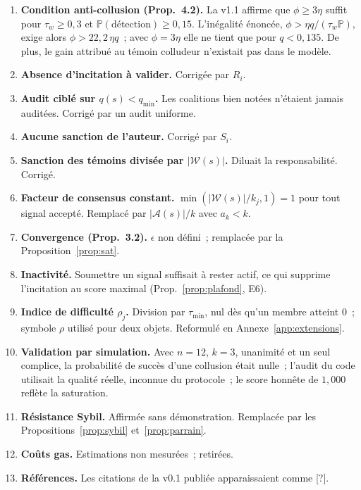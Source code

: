 \documentclass[11pt,a4paper]{article}
\theoremstyle{plain}
\theoremstyle{definition}
\theoremstyle{remark}
\newcommand{\1}{\mathbf{1}}
\newcommand{\Prob}{\mathbb{P}}
\begin{document}
\begin{enumerate}
  \item \textbf{Condition anti-collusion (Prop.~4.2).} La v1.1 affirme que
    $\phi\ge3\eta$ suffit pour $\tau_w\ge0{,}3$ et $\Prob(\text{détection})\ge0{,}15$.
    L'inégalité énoncée, $\phi>\eta q/(\tau_w\Prob)$, exige alors
    $\phi>22{,}2\,\eta q$~; avec $\phi=3\eta$ elle ne tient que pour $q<0{,}135$.
    De plus, le gain attribué au témoin colludeur n'existait pas dans le modèle.
  \item \textbf{Absence d'incitation à valider.} Corrigée par $R_i$.
  \item \textbf{Audit ciblé sur $q(s)<q_{\min}$.} Les coalitions bien notées
    n'étaient jamais auditées. Corrigé par un audit uniforme.
  \item \textbf{Aucune sanction de l'auteur.} Corrigé par $S_i$.
  \item \textbf{Sanction des témoins divisée par $|\mathcal{W}(s)|$.} Diluait la
    responsabilité. Corrigé.
  \item \textbf{Facteur de consensus constant.} $\min(|\mathcal{W}(s)|/k_j,1)=1$
    pour tout signal accepté. Remplacé par $|\mathcal{A}(s)|/k$ avec $a_k<k$.
  \item \textbf{Convergence (Prop.~3.2).} $\epsilon$ non défini~; remplacée par
    la Proposition~\ref{prop:sat}.
  \item \textbf{Inactivité.} Soumettre un signal suffisait à rester actif, ce qui
    supprime l'incitation au score maximal (Prop.~\ref{prop:plafond}, E6).
  \item \textbf{Indice de difficulté $\rho_j$.} Division par $\tau_{\min}$, nul
    dès qu'un membre atteint 0~; symbole $\rho$ utilisé pour deux objets.
    Reformulé en Annexe~\ref{app:extensions}.
  \item \textbf{Validation par simulation.} Avec $n=12$, $k=3$, unanimité et un
    seul complice, la probabilité de succès d'une collusion était nulle~;
    l'audit du code utilisait la qualité réelle, inconnue du protocole~; le
    score honnête de $1{,}000$ reflète la saturation.
  \item \textbf{Résistance Sybil.} Affirmée sans démonstration. Remplacée par
    les Propositions~\ref{prop:sybil} et~\ref{prop:parrain}.
  \item \textbf{Coûts gas.} Estimations non mesurées~; retirées.
  \item \textbf{Références.} Les citations de la v0.1 publiée apparaissaient
    comme \og{}[?]\fg{}.
\end{enumerate}
\end{document}
